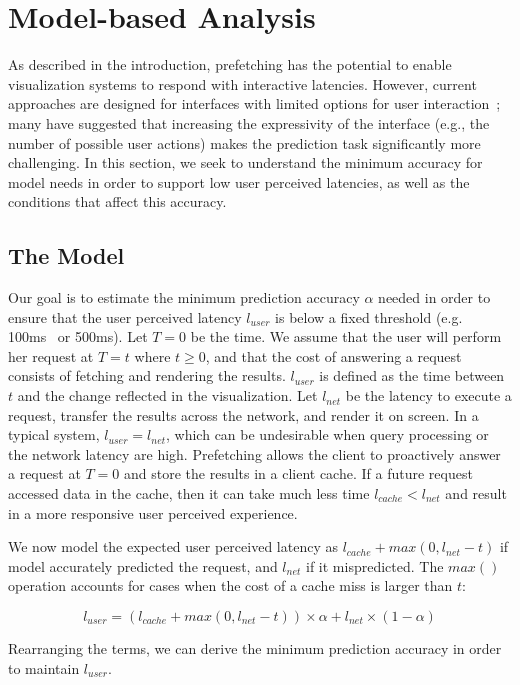 
\section{Model-based Analysis}

As described in the introduction, prefetching has the potential to enable visualization systems to respond with interactive latencies.  However, current approaches are designed for interfaces with limited options for user interaction~\cite{}; many have suggested that increasing the expressivity of the interface (e.g., the number of possible user actions) makes the prediction task significantly more challenging.  In this section, we seek to understand the minimum accuracy for model needs in order to support low user perceived latencies, as well as the conditions that affect this accuracy.

\subsection{The Model}

Our goal is to estimate the minimum prediction accuracy $\alpha$ needed in order to ensure that the user perceived latency $l_{user}$ is below a fixed threshold (e.g. 100ms~\cite{} or 500ms).
Let $T=0$ be the time.
We assume that the user will perform her request at $T=t$ where $t \ge 0$, and that the cost of answering a request consists of fetching and rendering the results.
$l_{user}$ is defined as the time between $t$ and the change reflected in the visualization. 
Let $l_{net}$ be the latency to execute a request, transfer the results across the network, and render it on screen.   In a typical system, $l_{user} = l_{net}$, which can be undesirable when query processing or the network latency are high.
Prefetching allows the client to proactively answer a request at $T=0$ and store the results in a client cache.
If a future request accessed data in the cache, then it can take much less time $l_{cache} < l_{net}$ and result in a more responsive user perceived experience.

We now model the expected user perceived latency as $l_{cache} + max(0, l_{net} - t)$ if model accurately predicted the request, and $l_{net}$ if it mispredicted.  The $max()$ operation accounts for cases when the cost of a cache miss is larger than $t$:

$$l_{user} = (l_{cache} + max(0, l_{net}-t))\times \alpha + l_{net}\times(1-\alpha) $$

Rearranging the terms, we can derive the minimum prediction accuracy in order to maintain $l_{user}$.

